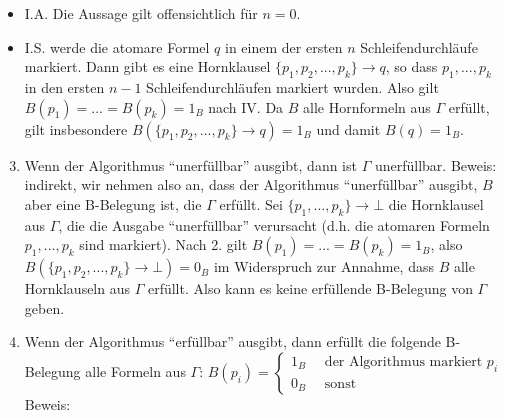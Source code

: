 \documentclass[a4paper]{article}
\begin{document}
\begin{multicols}{3}
  \begin{itemize}
    \itemsep1pt\parskip0pt
    \item
          I.A. Die Aussage gilt offensichtlich für $n=0$.
    \item
          I.S. werde die atomare Formel $q$ in einem der ersten $n$
          Schleifendurchläufe markiert. Dann gibt es eine Hornklausel
          $\{p_1,p_2 ,... ,p_k\}\rightarrow q$, so dass $p_1 ,... ,p_k$ in den
          ersten $n-1$ Schleifendurchläufen markiert wurden. Also gilt
          $B(p_1)=...=B(p_k) = 1_B$ nach IV. Da $B$ alle Hornformeln aus
          $\Gamma$ erfüllt, gilt insbesondere
          $B(\{p_1 ,p_2 ,... ,p_k\}\rightarrow q) = 1_B$ und damit $B(q) = 1_B$.
  \end{itemize}

  \begin{enumerate}
    \setcounter{enumi}{2}
    \itemsep1pt\parskip0pt
    \item
          Wenn der Algorithmus ``unerfüllbar'' ausgibt, dann ist $\Gamma$
          unerfüllbar. Beweis: indirekt, wir nehmen also an, dass der
          Algorithmus ``unerfüllbar'' ausgibt, $B$ aber eine B-Belegung ist, die
          $\Gamma$ erfüllt. Sei $\{p_1 ,... ,p_k\}\rightarrow\bot$ die
          Hornklausel aus $\Gamma$, die die Ausgabe ``unerfüllbar'' verursacht
          (d.h. die atomaren Formeln $p_1 ,... ,p_k$ sind markiert). Nach 2.
          gilt $B(p_1) =...=B(p_k) = 1_B$, also
          $B(\{p_1 ,p_2 ,... ,p_k\}\rightarrow\bot) = 0_B$ im Widerspruch zur
          Annahme, dass $B$ alle Hornklauseln aus $\Gamma$ erfüllt. Also kann es
          keine erfüllende B-Belegung von $\Gamma$ geben.
    \item
          Wenn der Algorithmus ``erfüllbar'' ausgibt, dann erfüllt die folgende
          B-Belegung alle Formeln aus $\Gamma$:
          $B(p_i)=\begin{cases} 1_B \quad\text{ der Algorithmus markiert } p_i \\ 0_B \quad\text{ sonst} \end{cases}$
          Beweis:


\end{enumerate}
\end{multicols}
\end{document}
